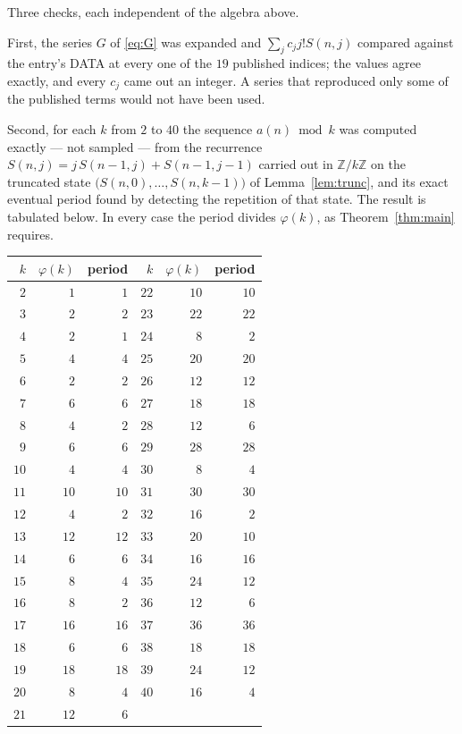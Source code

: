 \documentclass[11pt,a4paper]{article}
\theoremstyle{plain}
\theoremstyle{definition}
\begin{document}
Three checks, each independent of the algebra above.

First, the series $G$ of \eqref{eq:G} was expanded and $\sum_j c_j j! S(n,j)$ compared
against the entry's DATA at every one of the $19$ published indices; the values
agree exactly, and every $c_j$ came out an integer. A series that reproduced only some of
the published terms would not have been used.

Second, for each $k$ from $2$ to $40$ the sequence $a(n)\bmod k$ was computed exactly
--- not sampled --- from the recurrence $S(n,j)=j\,S(n-1,j)+S(n-1,j-1)$ carried out in
$\mathbb{Z}/k\mathbb{Z}$ on the truncated state
$\bigl(S(n,0),\dots,S(n,k-1)\bigr)$ of Lemma~\ref{lem:trunc}, and its exact eventual
period found by detecting the repetition of that state. The result is tabulated below.
In every case the period divides $\varphi(k)$, as Theorem~\ref{thm:main} requires.

\begin{center}\small
\begin{tabular}{rrr@{\qquad\qquad}rrr}
$k$ & $\varphi(k)$ & period & $k$ & $\varphi(k)$ & period \\ \hline
$2$ & $1$ & $1$ & $22$ & $10$ & $10$ \\
$3$ & $2$ & $2$ & $23$ & $22$ & $22$ \\
$4$ & $2$ & $1$ & $24$ & $8$ & $2$ \\
$5$ & $4$ & $4$ & $25$ & $20$ & $20$ \\
$6$ & $2$ & $2$ & $26$ & $12$ & $12$ \\
$7$ & $6$ & $6$ & $27$ & $18$ & $18$ \\
$8$ & $4$ & $2$ & $28$ & $12$ & $6$ \\
$9$ & $6$ & $6$ & $29$ & $28$ & $28$ \\
$10$ & $4$ & $4$ & $30$ & $8$ & $4$ \\
$11$ & $10$ & $10$ & $31$ & $30$ & $30$ \\
$12$ & $4$ & $2$ & $32$ & $16$ & $2$ \\
$13$ & $12$ & $12$ & $33$ & $20$ & $10$ \\
$14$ & $6$ & $6$ & $34$ & $16$ & $16$ \\
$15$ & $8$ & $4$ & $35$ & $24$ & $12$ \\
$16$ & $8$ & $2$ & $36$ & $12$ & $6$ \\
$17$ & $16$ & $16$ & $37$ & $36$ & $36$ \\
$18$ & $6$ & $6$ & $38$ & $18$ & $18$ \\
$19$ & $18$ & $18$ & $39$ & $24$ & $12$ \\
$20$ & $8$ & $4$ & $40$ & $16$ & $4$ \\
$21$ & $12$ & $6$ &  & & \\
\end{tabular}
\end{center}
\end{document}
